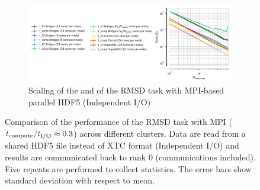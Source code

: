 \begin{figure}[ht!]
\begin{subfigure} {.8\textwidth}
  \includegraphics[width=\linewidth]{figures/Clusters_IO_compute_scaling.pdf}
  \caption{Scaling of the \tcomp and \tIO of the RMSD task with MPI-based parallel HDF5 (Independent I/O)}
  \label{fig:compute-IO-scaling-clusters}
\end{subfigure}
%
\caption{Comparison of the performance of the RMSD task with MPI (${t}_{\text{compute}}/{t}_{\text{I/O}} \approx 0.3$)
across different clusters. Data are read from a shared HDF5 file instead of XTC format (Independent I/O)
and results are communicated back to rank 0 (communications included). Five repeats are performed to 
collect statistics. The error bars show standard deviation with respect to mean.}
\label{fig:MPIwithIO-clusters}
\end{figure} 

